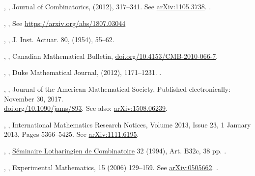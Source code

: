 \documentclass[12pt]{amsart}
\theoremstyle{plain}
\theoremstyle{definition}
\theoremstyle{remark}
\begin{document}
\begin{thebibliography}{10}
,
, 
Journal of Combinatorics,  (2012), 317--341. 
See \href{http://arxiv.org/abs/arXiv:1105.3738}{arXiv:1105.3738}. .

,
, 
See \href{https://arxiv.org/abs/1807.03044}{https://arxiv.org/abs/1807.03044}

,
, J. Inst. Actuar. 80, (1954), 55--62.


 ,
,
Canadian Mathematical Bulletin,
\href{https://doi.org/10.4153/CMB-2010-066-7}{doi.org/10.4153/CMB-2010-066-7}. 

,
,
Duke Mathematical Journal,   (2012), 1171--1231. .

,
,
Journal of the American Mathematical Society, Published electronically: November 30, 2017.\\
\href{https://doi.org/10.1090/jams/893}{doi.org/10.1090/jams/893}.
See also: \href{http://arxiv.org/abs/arXiv:1508.06239}{arXiv:1508.06239}.

,
,
International Mathematics Research Notices, Volume 2013, Issue 23, 1 January 2013, Pages 5366--5425.
See \href{https://arxiv.org/abs/1111.6195}{arXiv:1111.6195}.

,
,
\href{http://www.mat.univie.ac.at/~slc/}{S\'eminaire Lotharingien de Combinatoire} 32 (1994), 
Art. B32c, 38 pp. .

,
,
Experimental Mathematics, 15 (2006) 129--159.
See \href{https://arxiv.org/abs/math/0505662}{arXiv:0505662}. .


\end{thebibliography}
\end{document}
